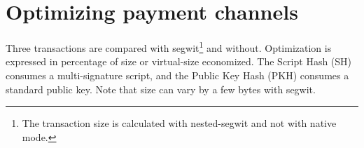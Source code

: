 \section{Optimizing payment channels}

Three transactions are compared with \gls{segwit}\footnote{ The transaction size
is calculated with nested-\gls{segwit} and not with native mode.} and without.
Optimization is expressed in percentage of size or virtual-size economized. The
Script Hash (SH) consumes a multi-signature script, and the Public Key Hash
(PKH) consumes a standard public key. Note that size can vary by a few bytes with
\gls{segwit}.

%

